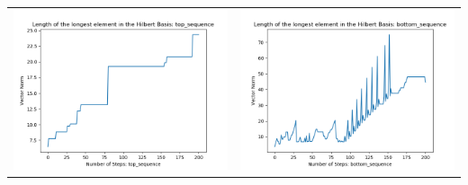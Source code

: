 \documentclass[10pt]{article}
\begin{document}
\begin{tabular}{c|c}
\begin{minipage}{.4\textwidth}
\includegraphics[width=\textwidth]{"DATA/5d/6 generators 2 bound A/top_sequence LENGTH"}
\end{minipage} &
\begin{minipage}{.4\textwidth}
\includegraphics[width=\textwidth]{"DATA/5d/6 generators 2 bound A bottomup/bottom_sequence LENGTH"}
\end{minipage}
\end{tabular}
\end{document}
